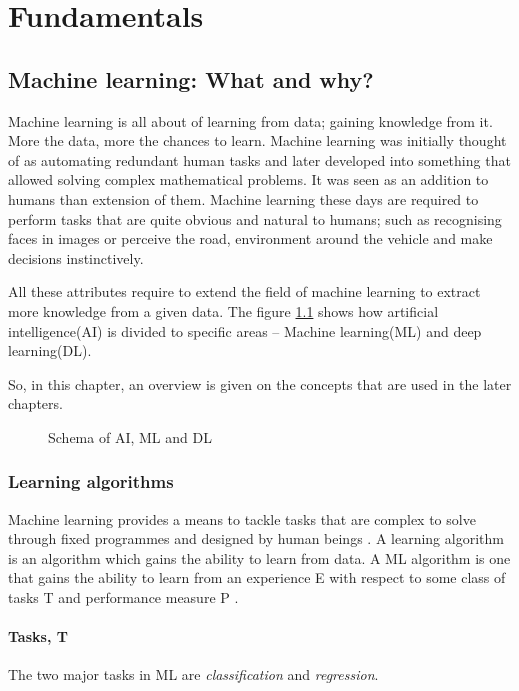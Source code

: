 \chapter{Fundamentals}
\section{Machine learning: What and why?}
Machine learning is all about of learning from data; gaining knowledge from it. More the
data, more the chances to learn. Machine learning was initially thought of as automating
redundant human tasks and later developed into something that allowed solving complex
mathematical problems. It was seen as an addition to humans than extension of them.
Machine learning these days are required to perform tasks that are quite obvious and
natural to humans; such as recognising faces in images or perceive the road, environment
around the vehicle and make decisions instinctively.

All these attributes require to extend the field of machine learning to extract more
knowledge from a given data. The figure \ref{fig:ai_ml_dl} shows how artificial
intelligence(AI) is divided to specific areas -- Machine learning(ML) and deep learning(DL).

So, in this chapter, an overview is given on the concepts that are used in the later chapters.

\begin{figure}[h]
	\centering
    \def\svgwidth{0.5\textwidth}
    \caption{Schema of AI, ML and DL}
    \label{fig:ai_ml_dl}
\end{figure}

\subsection{Learning algorithms}
Machine learning provides a means to tackle tasks that are complex to solve through fixed
programmes and designed by human beings \cite{Goodfellow-et-al-2016}. A learning algorithm
is an algorithm which gains the ability to learn from data. A ML algorithm is one that
gains the ability to learn from an experience E with respect to some class of tasks T and
performance measure P \cite{mitchell1996m}.

\subsubsection*{Tasks, T}
The two major tasks in ML are \textit{classification} and \textit{regression}.

